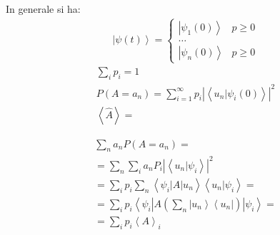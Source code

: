 
In generale si ha:
\begin{equation}\begin{split}
\left |\psi \left(t\right) \right\rangle=\begin{cases}
\left |\psi _1\left(0\right) \right\rangle & p\ge 0 \\
\dots\\
\left |\psi _n\left(0\right) \right\rangle & p\ge 0
\end{cases}
\end{split}\end{equation}
\begin{equation}\begin{split}
\sum_i{p_i}=1\\
P\left(A=a_n\right)=\sum_{i=1}^{\infty }{p_i\left|\left\langle u_n|\psi _i\left(0\right) \right\rangle\right|^2}\\
\left\langle \hat A \right\rangle=
\end{split}\end{equation}

\begin{equation}\begin{split}
\sum_n{a_nP\left(A=a_n\right)}=\\
=\sum_n\sum_i{a_nP_i|\left\langle u_n|\psi _i \right\rangle|^2}\\
=\sum_i{p_i}\sum_n{\left\langle \psi _i|A|u_n \right\rangle\left\langle u_n|\psi _i \right\rangle}=\\
=\sum_i{p_i\left\langle \psi _i|A\left(\sum_n{\left |u_n \right\rangle\left\langle u_n\right |}\right)|\psi _i \right\rangle}=\\
=\sum_i{p_i\left\langle A \right\rangle_i}
\end{split}\end{equation}